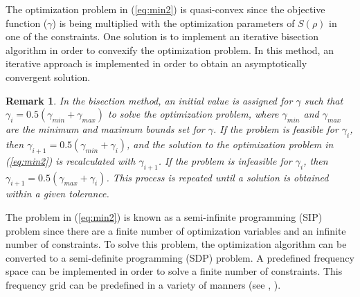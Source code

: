 \documentclass[a4paper, 10pt, conference]{ieeeconf}
\newtheorem*{remark}{Remark}
\begin{document}
The optimization problem in (\ref{eq:min2}) is quasi-convex since the objective function ($\gamma$) is being multiplied with the optimization parameters of $S(\rho)$ in one of the constraints. One solution is to implement an iterative bisection algorithm in order to convexify the optimization problem. In this method, an iterative approach is implemented in order to obtain an asymptotically convergent solution. 
\begin{remark}
In the bisection method, an initial value is assigned for $\gamma$ such that $\gamma_i = 0.5(\gamma_{min} + \gamma_{max})$ to solve the optimization problem, where $\gamma_{min}$ and $\gamma_{max}$ are the minimum and maximum bounds set for $\gamma$. If the problem is feasible for $\gamma_i$, then $\gamma_{i+1} = 0.5(\gamma_{min} + \gamma_i)$, and the solution to the optimization problem in (\ref{eq:min2}) is recalculated with $\gamma_{i+1}$. If the problem is infeasible for $\gamma_i$, then $\gamma_{i+1} = 0.5(\gamma_{max} + \gamma_i)$. This process is repeated until a solution is obtained within a given tolerance. 
\end{remark}

The problem in (\ref{eq:min2}) is known as a semi-infinite programming (SIP) problem since there are a finite number of optimization variables and an infinite number of constraints. To solve this problem, the optimization algorithm can be converted to a semi-definite programming (SDP) problem. A predefined frequency space can be implemented in order to solve a finite number of constraints. This frequency grid can be predefined in a variety of manners (see \cite{SVB11}, \cite{GKL10b}).  
\end{document}
